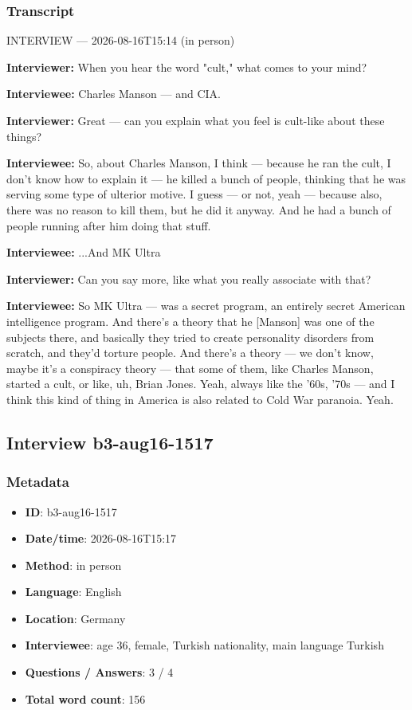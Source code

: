 \subsubsection*{Transcript}
INTERVIEW — 2026-08-16T15:14 (in person)

\textbf{Interviewer:} When you hear the word "cult," what comes to your mind?

\textbf{Interviewee:} Charles Manson — and CIA.

\textbf{Interviewer:} Great — can you explain what you feel is cult-like about these things?

\textbf{Interviewee:} So, about Charles Manson, I think — because he ran the cult, I don't know how to explain it — he killed a bunch of people, thinking that he was serving some type of ulterior motive. I guess — or not, yeah — because also, there was no reason to kill them, but he did it anyway. And he had a bunch of people running after him doing that stuff.

\textbf{Interviewee:} ...And MK Ultra

\textbf{Interviewer:}  Can you say more, like what you really associate with that?

\textbf{Interviewee:} So MK Ultra — was a secret program, an entirely secret American intelligence program. And there's a theory that he [Manson] was one of the subjects there, and basically they tried to create personality disorders from scratch, and they'd torture people. And there's a theory — we don't know, maybe it's a conspiracy theory — that some of them, like Charles Manson, started a cult, or like, uh, Brian Jones. Yeah, always like the '60s, '70s — and I think this kind of thing in America is also related to Cold War paranoia. Yeah.

\subsection{Interview b3-aug16-1517}\label{int:b3-aug16-1517}
\subsubsection*{Metadata}
\begin{itemize}
  \item \textbf{ID}: b3-aug16-1517
  \item \textbf{Date/time}: 2026-08-16T15:17
  \item \textbf{Method}: in person
  \item \textbf{Language}: English
  \item \textbf{Location}: Germany
  \item \textbf{Interviewee}: age 36, female, Turkish nationality, main language Turkish
  \item \textbf{Questions / Answers}: 3 / 4
  \item \textbf{Total word count}: 156
\end{itemize}
